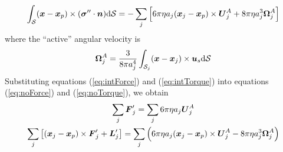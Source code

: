 \begin{appendices}
\begin{equation}
    \int_{\mathcal{S}}(\boldsymbol{x}-\boldsymbol{x}_p)\times(\boldsymbol{\sigma}''\cdot\boldsymbol{n}) \mathrm{d}\mathcal{S} = -\sum_j\left[  6 \pi \eta a_j (\boldsymbol{x}_j-\boldsymbol{x}_p)\times\boldsymbol{U}^A_j  + 8\pi\eta a_j^3\boldsymbol{\Omega}^{A}_j\right] \label{eq:intTorque}
\end{equation}
where the ``active'' angular velocity is 
\begin{equation}
    \boldsymbol{\Omega}^{A}_j = \frac{3}{8\pi a_j^4}\int_{\mathcal{S}_j} (\boldsymbol{x}-\boldsymbol{x}_j) \times \boldsymbol{u}_s\mathrm{d}\mathcal{S}
\end{equation}
Substituting equations (\ref{eq:intForce}) and (\ref{eq:intTorque}) into equations (\ref{eq:noForce}) and (\ref{eq:noTorque}), we obtain 
\begin{gather}
    \sum_j \boldsymbol{F}'_j  = \sum_j 6\pi \eta a_j \boldsymbol{U}^A_j \label{eq:motion1}
    \\
    \sum_j \left[(\boldsymbol{x}_j-\boldsymbol{x}_p)\times \boldsymbol{F}'_j + \boldsymbol{L}'_j\right]  = \sum_j  \left(6 \pi \eta a_j (\boldsymbol{x}_j-\boldsymbol{x}_p)\times\boldsymbol{U}^A_j  - 8\pi\eta a_j^3\boldsymbol{\Omega}^{A}_j\right) \label{eq:motion2}
\end{gather}


\end{appendices}
